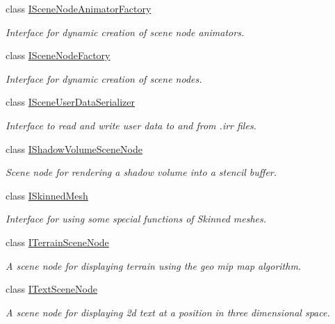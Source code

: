 \begin{DoxyCompactItemize}
class \hyperlink{classirr_1_1scene_1_1ISceneNodeAnimatorFactory}{I\+Scene\+Node\+Animator\+Factory}
\begin{DoxyCompactList}\small\item\em Interface for dynamic creation of scene node animators. \end{DoxyCompactList}\item 
class \hyperlink{classirr_1_1scene_1_1ISceneNodeFactory}{I\+Scene\+Node\+Factory}
\begin{DoxyCompactList}\small\item\em Interface for dynamic creation of scene nodes. \end{DoxyCompactList}\item 
class \hyperlink{classirr_1_1scene_1_1ISceneUserDataSerializer}{I\+Scene\+User\+Data\+Serializer}
\begin{DoxyCompactList}\small\item\em Interface to read and write user data to and from .irr files. \end{DoxyCompactList}\item 
class \hyperlink{classirr_1_1scene_1_1IShadowVolumeSceneNode}{I\+Shadow\+Volume\+Scene\+Node}
\begin{DoxyCompactList}\small\item\em Scene node for rendering a shadow volume into a stencil buffer. \end{DoxyCompactList}\item 
class \hyperlink{classirr_1_1scene_1_1ISkinnedMesh}{I\+Skinned\+Mesh}
\begin{DoxyCompactList}\small\item\em Interface for using some special functions of Skinned meshes. \end{DoxyCompactList}\item 
class \hyperlink{classirr_1_1scene_1_1ITerrainSceneNode}{I\+Terrain\+Scene\+Node}
\begin{DoxyCompactList}\small\item\em A scene node for displaying terrain using the geo mip map algorithm. \end{DoxyCompactList}\item 
class \hyperlink{classirr_1_1scene_1_1ITextSceneNode}{I\+Text\+Scene\+Node}
\begin{DoxyCompactList}\small\item\em A scene node for displaying 2d text at a position in three dimensional space. \end{DoxyCompactList}\item 

\end{DoxyCompactItemize}
